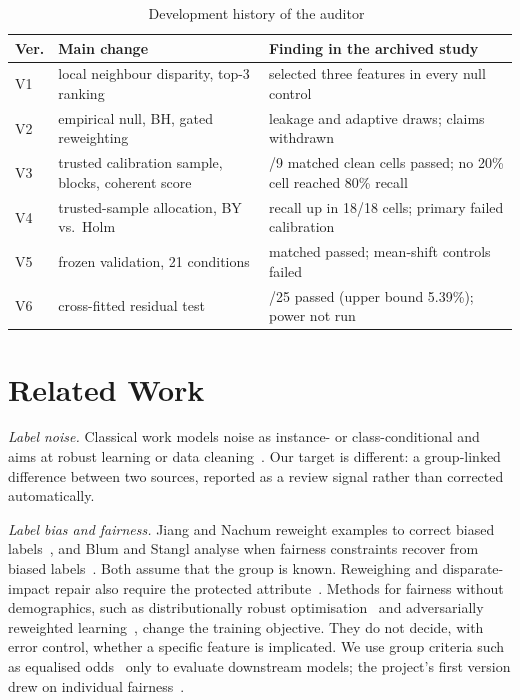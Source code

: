 \documentclass[conference]{IEEEtran}
\begin{document}
\begin{table}[t]
\caption{Development history of the auditor~\cite{salwan2026report}}
\label{tab:history}
\centering
\footnotesize
\setlength{\tabcolsep}{3pt}
\begin{tabular}{@{}l>{\raggedright\arraybackslash}p{3.3cm}>{\raggedright\arraybackslash}p{3.8cm}@{}}
\toprule
Ver. & Main change & Finding in the archived study\\
\midrule
V1 & local neighbour disparity, top-3 ranking & selected three features in every null control\\
V2 & empirical null, BH, gated reweighting & leakage and adaptive draws; claims withdrawn\\
V3 & trusted calibration sample, blocks, coherent score & 9/9 matched clean cells passed; no 20\% cell reached 80\% recall\\
V4 & trusted-sample allocation, BY vs.\ Holm & recall up in 18/18 cells; primary failed calibration\\
V5 & frozen validation, 21 conditions & 18 matched passed; mean-shift controls failed\\
V6 & cross-fitted residual test & 24/25 passed (upper bound 5.39\%); power not run\\
\bottomrule
\end{tabular}
\end{table}

\section{Related Work}
\emph{Label noise.} Classical work models noise as instance- or class-conditional and aims at robust learning or data cleaning~\cite{frenay2014classification,northcutt2021confident}. Our target is different: a group-linked difference between two sources, reported as a review signal rather than corrected automatically.

\emph{Label bias and fairness.} Jiang and Nachum reweight examples to correct biased labels~\cite{jiang2020identifying}, and Blum and Stangl analyse when fairness constraints recover from biased labels~\cite{blum2020recovering}. Both assume that the group is known. Reweighing and disparate-impact repair also require the protected attribute~\cite{kamiran2012data,feldman2015certifying}. Methods for fairness without demographics, such as distributionally robust optimisation~\cite{hashimoto2018fairness} and adversarially reweighted learning~\cite{lahoti2020fairness}, change the training objective. They do not decide, with error control, whether a specific feature is implicated. We use group criteria such as equalised odds~\cite{hardt2016equality} only to evaluate downstream models; the project's first version drew on individual fairness~\cite{dwork2012fairness}.
\end{document}
